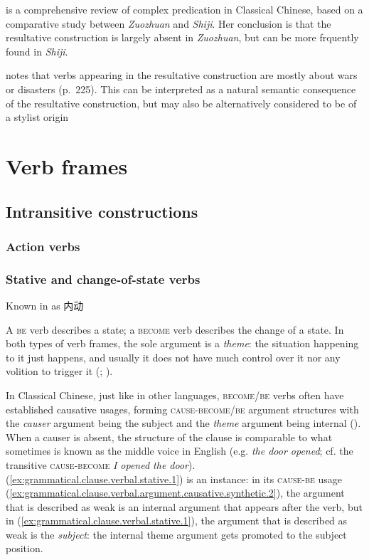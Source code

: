 \documentclass[UTF8, a4paper, oneside, scheme=plain, 12pt]{ctexrep}
\newcommand*{\citepage}[1]{p.~{#1}}
\newcommand*{\citepages}[1]{pp.~{#1}}
\newcommand*{\term}[1]{\emph{#1}}
\newcommand{\form}[1]{\emph{#1}}
\newcommand{\work}[1]{\textit{#1}}
\newcommand*{\category}[1]{\textsc{#1}}
\begin{document}
\citet[\citepages{212-240}]{he2005shiji} is a comprehensive review of complex predication in Classical Chinese,
based on a comparative study between \work{Zuozhuan} and \work{Shiji}.
Her conclusion is that the resultative construction is largely absent in \work{Zuozhuan},
but can be more frquently found in \work{Shiji}.

\citet{he2005shiji} notes that verbs appearing in the resultative construction are mostly about wars or disasters (\citepage{225}).
This can be interpreted as a natural semantic consequence of the resultative construction,
but may also be alternatively considered to be of a stylist origin

\chapter{Verb frames}



\section{Intransitive constructions}

\subsection{Action verbs}\label{sec:valency.intransitive.action}

\subsection{Stative and change-of-state verbs}
\label{sec:valency.simple.state-and-change}

Known in \citet{meiguang2018} as 内动

A \category{be} verb describes a state;
a \category{become} verb describes the change of a state.
In both types of verb frames,
the sole argument is a \term{theme}:
the situation happening to it just happens,
and usually it does not have much control over it nor any volition to trigger it
(\citealt[\citepage{345}]{li2004grammar}; \citealt[\citepage{275}]{meiguang2018}).

In Classical Chinese, just like in other languages,
\category{become}/\category{be} verbs often have established causative usages,
forming \category{cause}-\category{become}/\category{be} argument structures
with the \term{causer} argument being the subject and the \term{theme} argument being internal
().
When a causer is absent, the structure of the clause 
is comparable to what sometimes is known as the middle voice in English
(e.g. \form{the door opened}; cf. the transitive \category{cause}-\category{become} \form{I opened the door}).
(\ref{ex:grammatical.clause.verbal.stative.1}) is an instance:
in its \category{cause}-\category{be} usage (\ref{ex:grammatical.clause.verbal.argument.causative.synthetic.2}),
the argument that is described as weak is an internal argument that appears after the verb,
but in (\ref{ex:grammatical.clause.verbal.stative.1}),
the argument that is described as weak is the \emph{subject}:
the internal theme argument gets promoted to the subject position.
\end{document}
